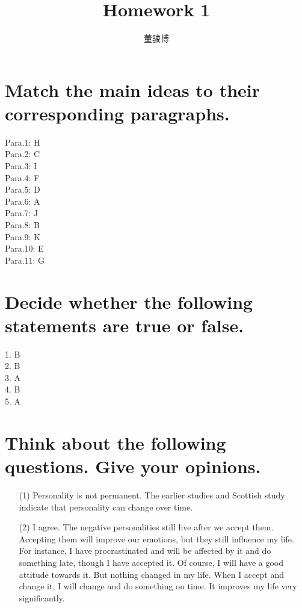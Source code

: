 \documentclass[onecolumn,oneside]{SUSTechHomework}
\author{董骏博}
\title{Homework 1}
\begin{document}
  \maketitle

  \section{Match the main ideas to their corresponding paragraphs.}
  Para.1: H \\
  Para.2: C\\
  Para.3: I\\
  Para.4: F\\
  Para.5: D\\
  Para.6: A\\
  Para.7: J\\
  Para.8: B\\
  Para.9: K\\
  Para.10: E\\
  Para.11: G
  \section{Decide whether the following statements are true or false.}
  1. B\\
  2. B\\
  3. A\\
  4. B\\
  5. A
  \section{Think about the following questions. Give your opinions.}
  \begin{itemize}
    \item [(1)] Personality is not permanent. The earlier studies and Scottish study indicate that personality can change over time.
    \item [(2)]I agree. The negative personalities still live after we accept them. Accepting them will improve our emotions, but they still influence my life. For instance, I have procrastinated and will be affected by it and do something late, though I have accepted it. Of course, I will have a good attitude towards it. But nothing changed in my life. When I accept and change it, I will change and do something on time. It improves my life very significantly.  
  \end{itemize}
  
\end{document}
